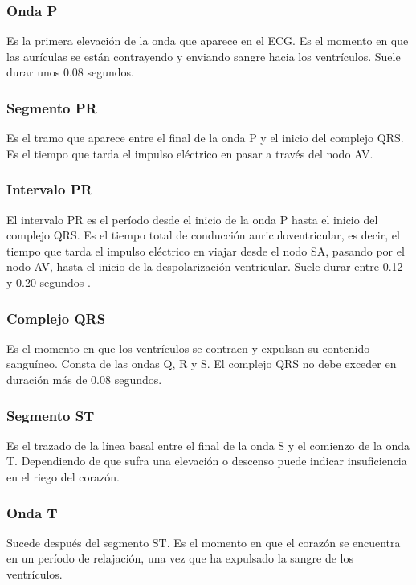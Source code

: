 \subsubsection{Onda P}
Es la primera elevación de la onda que aparece en el ECG. Es el momento en que las aurículas se están contrayendo y enviando sangre hacia los ventrículos. Suele durar unos 0.08 segundos.

\subsubsection{Segmento PR}
Es el tramo que aparece entre el final de la onda P y el inicio del complejo QRS. Es el tiempo que tarda el impulso eléctrico en pasar a través del nodo AV.

\subsubsection{Intervalo PR}
El intervalo PR es el período desde el inicio de la onda P hasta el inicio del complejo QRS. Es el tiempo total de conducción auriculoventricular, es decir, el tiempo que tarda el impulso eléctrico en viajar desde el nodo SA, pasando por el nodo AV, hasta el inicio de la despolarización ventricular. Suele durar entre 0.12 y 0.20 segundos \cite{azcona2009electrocardiograma}.

\subsubsection{Complejo QRS}
Es el momento en que los ventrículos se contraen y expulsan su contenido sanguíneo. Consta de las ondas Q, R y S. El complejo QRS no debe exceder en duración más de 0.08 segundos.

\subsubsection{Segmento ST}
Es el trazado de la línea basal entre el final de la onda S y el comienzo de la onda T. Dependiendo de que sufra una elevación o descenso puede indicar insuficiencia en el riego del corazón.

\subsubsection{Onda T}
Sucede después del segmento ST. Es el momento en que el corazón se encuentra en un período de relajación, una vez que ha expulsado la sangre de los ventrículos.

